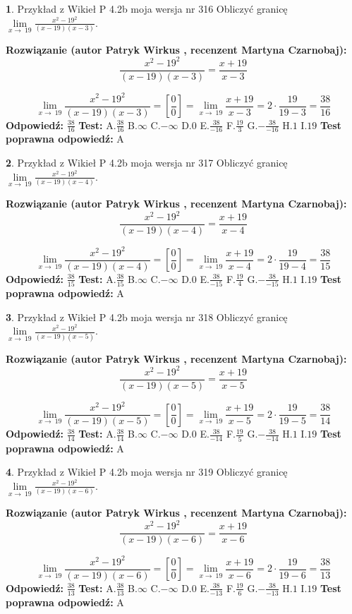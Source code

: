 \documentclass[12pt, a4paper]{article}
\theoremstyle{definition} %
\newtheorem{zad}{}
\newcommand{\zadStart}[1]{\begin{zad}#1\newline}
\newcommand{\zadStop}{\end{zad}}
\newcommand{\rozwStart}[2]{\noindent \textbf{Rozwiązanie (autor #1 , recenzent #2): }\newline}
\newcommand{\rozwStop}{\newline}
\newcommand{\odpStart}{\noindent \textbf{Odpowiedź:}\newline}
\newcommand{\odpStop}{\newline}
\newcommand{\testStart}{\noindent \textbf{Test:}\newline}
\newcommand{\testStop}{\newline}
\newcommand{\kluczStart}{\noindent \textbf{Test poprawna odpowiedź:}\newline}
\newcommand{\kluczStop}{\newline}
\begin{document}
\zadStart{Przykład z Wikieł P 4.2b moja wersja nr 316}
Obliczyć granicę $\lim\limits_{x\to\ 19}\frac{x^{2}-19^{2}}{(x-19)(x-3)}$.
\zadStop
\rozwStart{Patryk Wirkus}{Martyna Czarnobaj}
$$\frac{x^{2}-19^{2}}{(x-19)(x-3)}=\frac{x+19}{x-3}$$

$$\lim\limits_{x\to\ 19}\frac{x^{2}-19^{2}}{(x-19)(x-3)}=[\frac{0}{0}]=\lim\limits_{x\to\ 19}\frac{x+19}{x-3}=2 \cdot \frac{19}{19-3} = \frac{38}{16}$$
\rozwStop
\odpStart
$\frac{38}{16}$
\odpStop
\testStart
A.$\frac{38}{16}$
B.$\infty$
C.$-\infty$
D.$0$
E.$\frac{38}{-16}$
F.$\frac{19}{3}$
G.$-\frac{38}{-16}$
H.$1$
I.$19$
\testStop
\kluczStart
A
\kluczStop



\zadStart{Przykład z Wikieł P 4.2b moja wersja nr 317}
Obliczyć granicę $\lim\limits_{x\to\ 19}\frac{x^{2}-19^{2}}{(x-19)(x-4)}$.
\zadStop
\rozwStart{Patryk Wirkus}{Martyna Czarnobaj}
$$\frac{x^{2}-19^{2}}{(x-19)(x-4)}=\frac{x+19}{x-4}$$

$$\lim\limits_{x\to\ 19}\frac{x^{2}-19^{2}}{(x-19)(x-4)}=[\frac{0}{0}]=\lim\limits_{x\to\ 19}\frac{x+19}{x-4}=2 \cdot \frac{19}{19-4} = \frac{38}{15}$$
\rozwStop
\odpStart
$\frac{38}{15}$
\odpStop
\testStart
A.$\frac{38}{15}$
B.$\infty$
C.$-\infty$
D.$0$
E.$\frac{38}{-15}$
F.$\frac{19}{4}$
G.$-\frac{38}{-15}$
H.$1$
I.$19$
\testStop
\kluczStart
A
\kluczStop



\zadStart{Przykład z Wikieł P 4.2b moja wersja nr 318}
Obliczyć granicę $\lim\limits_{x\to\ 19}\frac{x^{2}-19^{2}}{(x-19)(x-5)}$.
\zadStop
\rozwStart{Patryk Wirkus}{Martyna Czarnobaj}
$$\frac{x^{2}-19^{2}}{(x-19)(x-5)}=\frac{x+19}{x-5}$$

$$\lim\limits_{x\to\ 19}\frac{x^{2}-19^{2}}{(x-19)(x-5)}=[\frac{0}{0}]=\lim\limits_{x\to\ 19}\frac{x+19}{x-5}=2 \cdot \frac{19}{19-5} = \frac{38}{14}$$
\rozwStop
\odpStart
$\frac{38}{14}$
\odpStop
\testStart
A.$\frac{38}{14}$
B.$\infty$
C.$-\infty$
D.$0$
E.$\frac{38}{-14}$
F.$\frac{19}{5}$
G.$-\frac{38}{-14}$
H.$1$
I.$19$
\testStop
\kluczStart
A
\kluczStop



\zadStart{Przykład z Wikieł P 4.2b moja wersja nr 319}
Obliczyć granicę $\lim\limits_{x\to\ 19}\frac{x^{2}-19^{2}}{(x-19)(x-6)}$.
\zadStop
\rozwStart{Patryk Wirkus}{Martyna Czarnobaj}
$$\frac{x^{2}-19^{2}}{(x-19)(x-6)}=\frac{x+19}{x-6}$$

$$\lim\limits_{x\to\ 19}\frac{x^{2}-19^{2}}{(x-19)(x-6)}=[\frac{0}{0}]=\lim\limits_{x\to\ 19}\frac{x+19}{x-6}=2 \cdot \frac{19}{19-6} = \frac{38}{13}$$
\rozwStop
\odpStart
$\frac{38}{13}$
\odpStop
\testStart
A.$\frac{38}{13}$
B.$\infty$
C.$-\infty$
D.$0$
E.$\frac{38}{-13}$
F.$\frac{19}{6}$
G.$-\frac{38}{-13}$
H.$1$
I.$19$
\testStop
\kluczStart
A
\kluczStop
\end{document}
